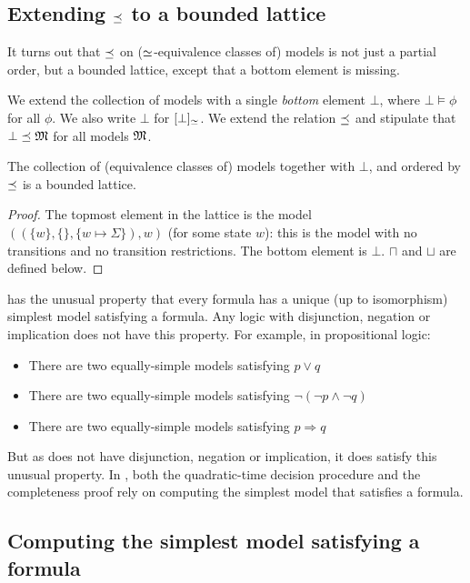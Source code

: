 \subsection{Extending $\preceq$ to a bounded lattice}
\label{boundedlattice}
It turns out that $\preceq $ on ($\simeq$-equivalence classes of)
models is not just a partial order, but a bounded lattice, except
that a bottom element is missing.

\begin{definition}
We extend the collection of models with a single \emph{bottom} element
$\bot$, where $\bot \models \phi$ for all $\phi$. We also write $\bot$
for $[\bot]_{\simeq}$.  We extend the relation $\preceq $ and
stipulate that $\bot \preceq \frak{M}$ for all models $\frak{M}$.
\end{definition}

\begin{theorem}
The collection of (equivalence classes of) models together with
$\bot$, and ordered by $\preceq$ is a bounded lattice.
\end{theorem}
\begin{proof}
The topmost element in the
lattice is the model $( (\{w\}, \{\}, \{w \mapsto \Sigma\}), w)$ (for
some state $w$): this is the model with no transitions and no
transition restrictions.
The bottom element is $\bot$. 
$\sqcap$ and $\sqcup$ are defined below.
\end{proof}

\Cathoristic{} has the unusual property that every formula has a unique (up to isomorphism) simplest  model satisfying a formula. 
Any logic with disjunction, negation or implication does not have this property.
For example, in propositional logic:
\begin{itemize}
\item
There are two equally-simple models satisfying $p \lor q$
\item
There are two equally-simple  models satisfying $\neg (\neg p \land \neg q)$
\item
There are two equally-simple models satisfying $p \Rightarrow q$
\end{itemize}
But as \cathoristic{} does not have disjunction, negation or implication, it does satisfy this unusual property.
In \cathoristic{}, both the quadratic-time decision procedure and the completeness proof rely on computing the simplest model that satisfies a formula. 

\subsection{Computing the simplest model satisfying a formula}
\label{simpl}

